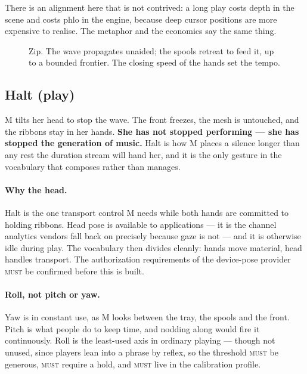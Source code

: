 \documentclass[11pt,a4paper]{article}
\newcommand{\MUST}{\textsc{must}}
\theoremstyle{definition}
\theoremstyle{plain}
\theoremstyle{remark}
\newcommand{\spools}{%
  \fill[ribL,opacity=.45,rounded corners=2pt] (1.55,5.40) rectangle (2.45,5.95);
  \fill[ribR,opacity=.45,rounded corners=2pt] (5.55,5.40) rectangle (6.45,5.95);
  \node[font=\scriptsize] at (2,6.22) {left spool};
  \node[font=\scriptsize] at (6,6.22) {right spool};
}
\newcommand{\musician}{%
  \draw[gray] (4,-0.10) circle (0.23);
  \node[font=\scriptsize] at (4,-0.10) {M};
}
\newcommand{\axes}{%
  \draw[->,gray,thin] (0.85,4.30) -- (1.45,4.30) node[right,font=\scriptsize]{$x$};
  \draw[->,gray,thin] (0.85,4.30) -- (0.85,4.90) node[above,font=\scriptsize]{$z$};
}
\newcommand{\ribbonszipped}{%
  \draw[ribL,opacity=.45,line width=16pt,line join=round]
    (2,5.40) -- (2,4.60) -- (3.72,4.20) -- (3.72,2.20) -- (3.10,1.70) -- (3.10,0.70);
  \draw[ribR,opacity=.45,line width=16pt,line join=round]
    (6,5.40) -- (6,4.60) -- (4.28,4.20) -- (4.28,2.20) -- (4.90,1.70) -- (4.90,0.70);
}
\newcommand{\mesh}[2]{%
  \draw[gray!75,decorate,decoration={zigzag,segment length=5pt,amplitude=3pt}]
    (4,#1) -- (4,#2);
}
\newcommand{\handat}[2]{\filldraw[fill=white,draw=gray!80,thin] (#1,#2) circle (0.17);}
\newcommand{\handsdefault}{\handat{3.10}{0.55}\handat{4.90}{0.55}}
\begin{document}
There is an alignment here that is not contrived: a long play costs depth in the scene and costs
phlo in the engine, because deep cursor positions are more expensive to realise. The metaphor and
the economics say the same thing.

\begin{figure}[H]\centering
{}
\caption{Zip. The wave propagates unaided; the spools retreat to feed it, up to a bounded frontier.
The closing speed of the hands set the tempo.}
\end{figure}

\subsection{Halt \normalfont(play)}
\label{sec:halt}

M tilts her head to stop the wave. The front freezes, the mesh is untouched, and the ribbons stay
in her hands. \textbf{She has not stopped performing --- she has stopped the generation of music.}
Halt is how M places a silence longer than any rest the duration stream will hand her, and it is
the only gesture in the vocabulary that composes rather than manages.

\paragraph{Why the head.} Halt is the one transport control M needs while both hands are committed
to holding ribbons. Head pose is available to applications --- it is the channel analytics vendors
fall back on precisely because gaze is not --- and it is otherwise idle during play. The vocabulary
then divides cleanly: hands move material, head handles transport. The authorization requirements
of the device-pose provider \MUST{} be confirmed before this is built.

\paragraph{Roll, not pitch or yaw.} Yaw is in constant use, as M looks between the tray, the spools
and the front. Pitch is what people do to keep time, and nodding along would fire it continuously.
Roll is the least-used axis in ordinary playing --- though not unused, since players lean into a
phrase by reflex, so the threshold \MUST{} be generous, \MUST{} require a hold, and \MUST{} live in
the calibration profile.
\end{document}
